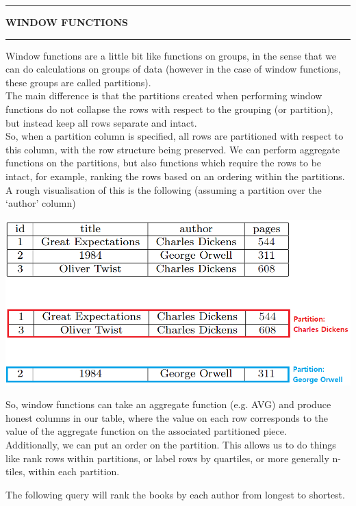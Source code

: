 \documentclass[8pt]{extarticle}
\newcommand{\heading}[1]{%
    \noindent
    \rule{\linewidth}{0.4pt}
    \begin{center}
        \vspace{-1ex}
        \textbf{#1}        
        \vspace{-2.5ex}
    \end{center}
    \rule{\linewidth}{0.4pt}
}
\begin{document}
\begin{multicols}{4}
\vspace{1ex}
\heading{WINDOW FUNCTIONS}

Window functions are a little bit like functions on groups, in the sense that we can do calculations on groups of data (however in the case of window functions, these groups are called partitions). \\

The main difference is that the partitions created when performing window functions do not collapse the rows with respect to the grouping (or partition), but instead keep all rows separate and intact.\\

So, when a partition column is specified, all rows are partitioned with respect to this column, with the row structure being preserved. We can perform aggregate functions on the partitions, but also functions which require the rows to be intact, for example, ranking the rows based on an ordering within the partitions.\\

A rough visualisation of this is the following (assuming a partition over the `author' column)

\begin{center}
\includegraphics[scale = 0.24]{window_functions.png}
\end{center}

So, window functions can take an aggregate function (e.g. AVG) and produce honest columns in our table, where the value on each row corresponds to the value of the aggregate function on the associated partitioned piece. \\

 Additionally, we can put an order on the partition. This allows us to do things like rank rows within partitions, or label rows by quartiles, or more generally n-tiles, within each partition.

The following query will rank the books by each author from longest to shortest.


\end{multicols}
\end{document}
